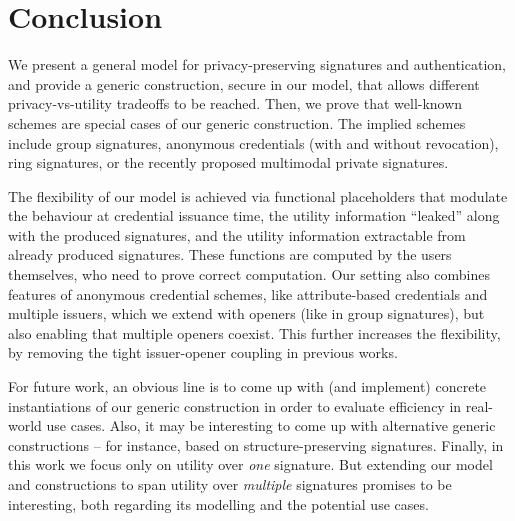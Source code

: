 \section{Conclusion}
\label{sec:conclusion}

We present a general model for privacy-preserving signatures and authentication,
and provide a generic construction, secure in our model, that allows
different privacy-vs-utility tradeoffs to be reached.
%
Then, we prove that well-known schemes are special cases of our generic
construction. The implied schemes include group signatures, anonymous
credentials (with and without revocation), ring signatures, or the recently
proposed multimodal private signatures.

The flexibility of our model is achieved via functional placeholders that
modulate the behaviour at credential issuance time, the utility
information ``leaked'' along with the produced signatures, and the utility
information extractable from already produced signatures. These functions are
computed by the users themselves, who need to prove correct computation.
Our setting also combines features of anonymous credential schemes, like
attribute-based credentials and multiple issuers, which we extend with openers
(like in group signatures), but also enabling that multiple openers coexist.
This further increases the flexibility, by removing the tight issuer-opener
coupling in previous works.

For future work, an obvious line is to come up with (and implement) concrete
instantiations of our generic construction in order to evaluate efficiency in
real-world use cases. Also, it may be interesting to come up with alternative
generic constructions -- for instance, based on structure-preserving signatures.
%
Finally, in this work we focus only on utility over \emph{one} signature. But
extending our model and constructions to span utility over \emph{multiple}
signatures promises to be interesting, both regarding its modelling and the
potential use cases.


